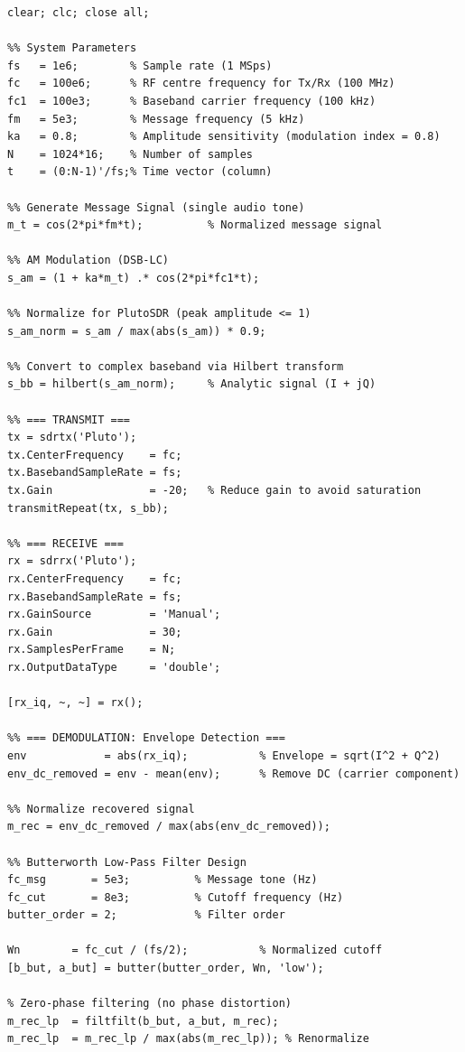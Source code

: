 \documentclass[12pt,a4paper]{article}
\begin{document}
\begin{lstlisting}[style=matlab, caption={AM Modulation and Demodulation with PlutoSDR}, label={lst:amcode}]
%% ===== AM MODULATION / DEMODULATION WITH PLUTO SDR =====
clear; clc; close all;

%% System Parameters
fs   = 1e6;        % Sample rate (1 MSps)
fc   = 100e6;      % RF centre frequency for Tx/Rx (100 MHz)
fc1  = 100e3;      % Baseband carrier frequency (100 kHz)
fm   = 5e3;        % Message frequency (5 kHz)
ka   = 0.8;        % Amplitude sensitivity (modulation index = 0.8)
N    = 1024*16;    % Number of samples
t    = (0:N-1)'/fs;% Time vector (column)

%% Generate Message Signal (single audio tone)
m_t = cos(2*pi*fm*t);          % Normalized message signal

%% AM Modulation (DSB-LC)
s_am = (1 + ka*m_t) .* cos(2*pi*fc1*t);

%% Normalize for PlutoSDR (peak amplitude <= 1)
s_am_norm = s_am / max(abs(s_am)) * 0.9;

%% Convert to complex baseband via Hilbert transform
s_bb = hilbert(s_am_norm);     % Analytic signal (I + jQ)

%% === TRANSMIT ===
tx = sdrtx('Pluto');
tx.CenterFrequency    = fc;
tx.BasebandSampleRate = fs;
tx.Gain               = -20;   % Reduce gain to avoid saturation
transmitRepeat(tx, s_bb);

%% === RECEIVE ===
rx = sdrrx('Pluto');
rx.CenterFrequency    = fc;
rx.BasebandSampleRate = fs;
rx.GainSource         = 'Manual';
rx.Gain               = 30;
rx.SamplesPerFrame    = N;
rx.OutputDataType     = 'double';

[rx_iq, ~, ~] = rx();

%% === DEMODULATION: Envelope Detection ===
env            = abs(rx_iq);           % Envelope = sqrt(I^2 + Q^2)
env_dc_removed = env - mean(env);      % Remove DC (carrier component)

%% Normalize recovered signal
m_rec = env_dc_removed / max(abs(env_dc_removed));

%% Butterworth Low-Pass Filter Design
fc_msg       = 5e3;          % Message tone (Hz)
fc_cut       = 8e3;          % Cutoff frequency (Hz)
butter_order = 2;            % Filter order

Wn        = fc_cut / (fs/2);           % Normalized cutoff
[b_but, a_but] = butter(butter_order, Wn, 'low');

% Zero-phase filtering (no phase distortion)
m_rec_lp  = filtfilt(b_but, a_but, m_rec);
m_rec_lp  = m_rec_lp / max(abs(m_rec_lp)); % Renormalize


\end{lstlisting}
\end{document}
